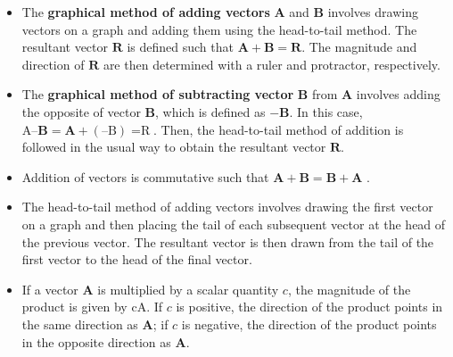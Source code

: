 \documentclass[
]{book}
\providecommand{\tightlist}{%
  \setlength{\itemsep}{0pt}\setlength{\parskip}{0pt}}
\begin{document}
\begin{itemize}
\tightlist
\item
  \protect\hypertarget{import-auto-id1165296253334}{}{The \textbf{graphical method of adding vectors} \(\mathbf{A}{}\) and
  \(\mathbf{B}{}\) involves drawing vectors on a graph and adding them
  using the head-to-tail method. The resultant vector \(\mathbf{R}{}\)
  is defined such that \({\textbf{A} + \textbf{B} = \textbf{R}}{}\). The
  magnitude and direction of \(\mathbf{R}{}\) are then determined with a
  ruler and protractor, respectively.}
\item
  \protect\hypertarget{import-auto-id1165298573640}{}{The \textbf{graphical method of subtracting vector} \(\mathbf{B}\) from
  \(\mathbf{A}{}\) involves adding the opposite of vector
  \(\mathbf{B}{}\), which is defined as \({- \mathbf{B}}{}\). In this
  case, \({\text{A}–\textbf{B} = \textbf{A} +}(\text{–B}){= \text{R}}\).
  Then, the head-to-tail method of addition is followed in the usual
  way to obtain the resultant vector
  \(\mathbf{R}\).}
\item
  \protect\hypertarget{import-auto-id1165296680072}{}{Addition of vectors is \protect\hypertarget{import-auto-id1165296680069}{}{commutative} such that
  \({\textbf{A} + \textbf{B} = \textbf{B} + \textbf{A}}{}\)
  .}
\item
  \protect\hypertarget{import-auto-id1165296269519}{}{The \protect\hypertarget{import-auto-id1165298982089}{}{head-to-tail method} of adding vectors involves drawing the first
  vector on a graph and then placing the tail of each subsequent
  vector at the head of the previous vector. The resultant vector is
  then drawn from the tail of the first vector to the head of the
  final vector.}
\item
  \protect\hypertarget{import-auto-id1165298819524}{}{If a vector \(\mathbf{A}{}\) is multiplied by a scalar quantity
  \(c{}\), the magnitude of the product is given by \(\text{cA}{}\). If
  \(c{}\) is positive, the direction of the product points in the same
  direction as \(\mathbf{A}{}\); if \(c{}\) is negative, the direction of
  the product points in the opposite direction as
  \(\mathbf{A}{}\).}
\end{itemize}
\end{document}
